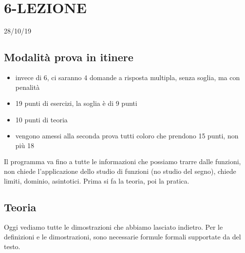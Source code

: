 \section*{6-LEZIONE}
28/10/19
\subsection*{Modalità prova in itinere}
\begin{itemize}
    \item invece di 6, ci saranno 4 domande a risposta multipla, senza soglia, ma con penalità
    \item 19 punti di esercizi, la soglia è di 9 punti
    \item 10 punti di teoria
    \item vengono amessi alla seconda prova tutti coloro che prendono 15 punti, non più 18
\end{itemize}
Il programma va fino a tutte le informazioni che possiamo trarre dalle funzioni, non chiede l'applicazione dello studio di funzioni (no studio del segno), chiede limiti, dominio, asintotici. Prima si fa la teoria, poi la pratica.
\newline
\newline
\subsection*{Teoria}
Oggi vediamo tutte le dimostrazioni che abbiamo lasciato indietro.
\newline
Per le definizioni e le dimostrazioni, sono necessarie formule formali supportate da del testo.
\newline
\newline
